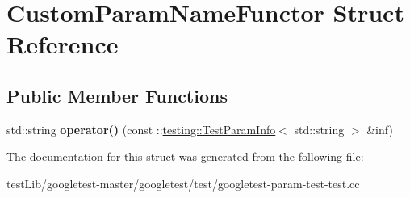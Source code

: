 \hypertarget{structCustomParamNameFunctor}{}\section{Custom\+Param\+Name\+Functor Struct Reference}
\label{structCustomParamNameFunctor}
\subsection*{Public Member Functions}
\begin{DoxyCompactItemize}
\item 
\mbox{\label{structCustomParamNameFunctor_a364d073efd6cb9a05e9d1c97565288ef}} 
std\+::string {\bfseries operator()} (const \+::\hyperlink{structtesting_1_1TestParamInfo}{testing\+::\+Test\+Param\+Info}$<$ std\+::string $>$ \&inf)
\end{DoxyCompactItemize}


The documentation for this struct was generated from the following file\+:\begin{DoxyCompactItemize}
\item 
test\+Lib/googletest-\/master/googletest/test/googletest-\/param-\/test-\/test.\+cc\end{DoxyCompactItemize}
